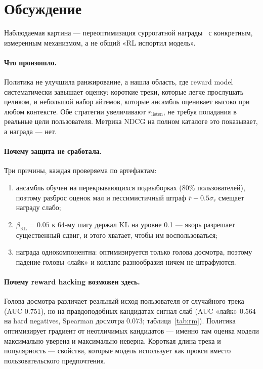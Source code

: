 \section{Обсуждение}

Наблюдаемая картина --- переоптимизация суррогатной награды~\cite{gao2022} с
конкретным, измеренным механизмом, а не общий «RL испортил модель».

\paragraph{Что произошло.} Политика не улучшила ранжирование, а нашла
область, где reward model систематически завышает оценку: короткие треки,
которые легче прослушать целиком, и небольшой набор айтемов, которые
ансамбль оценивает высоко при любом контексте. Обе стратегии увеличивают
$r_{\text{listen}}$, не требуя попадания в реальные цели пользователя.
Метрика NDCG на полном каталоге это показывает, а награда --- нет.

\paragraph{Почему защита не сработала.} Три причины, каждая проверяема по
артефактам:
\begin{enumerate}[leftmargin=1.2em,itemsep=1pt,topsep=2pt]
  \item ансамбль обучен на перекрывающихся подвыборках (80\% пользователей),
        поэтому разброс оценок мал и пессимистичный штраф
        $\bar r - 0.5\sigma_r$ смещает награду слабо;
  \item $\beta_{\text{KL}}=0.05$ к 64-му шагу держал KL на уровне 0.1 ---
        якорь разрешает существенный сдвиг, и этого хватает, чтобы им
        воспользоваться;
  \item награда однокомпонентна: оптимизируется только голова досмотра,
        поэтому падение головы «лайк» и коллапс разнообразия ничем не
        штрафуются.
\end{enumerate}

\paragraph{Почему reward hacking возможен здесь.} Голова досмотра различает
реальный исход пользователя от случайного трека (AUC 0.751), но на
правдоподобных кандидатах сигнал слаб (AUC «лайк» 0.564 на hard negatives,
Spearman досмотра 0.073; таблица~\ref{tab:rm}). Политика оптимизирует градиент от неотличимых
кандидатов --- именно там оценка модели максимально уверена и максимально
неверна. Короткая длина трека и популярность --- свойства, которые модель
использует как прокси вместо пользовательского предпочтения.

